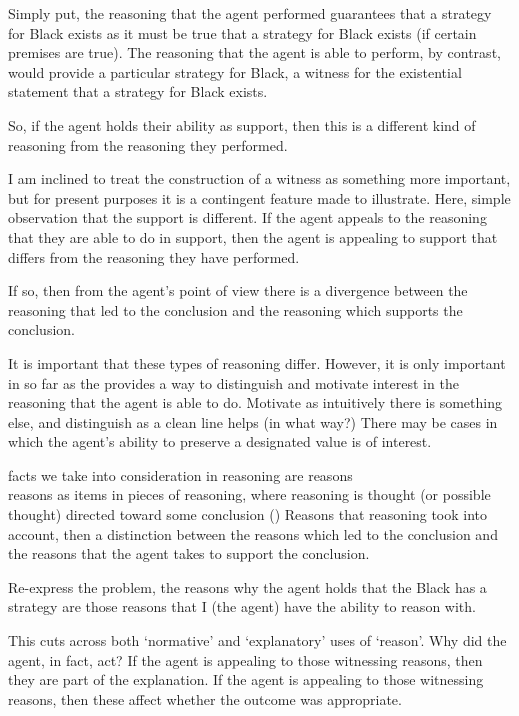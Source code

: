 \documentclass[10pt]{article}
\begin{document}
\begin{note}
  Simply put, the reasoning that the agent performed guarantees that a strategy for Black exists as it must be true that a strategy for Black exists (if certain premises are true).
  The reasoning that the agent is able to perform, by contrast, would provide a particular strategy for Black, a witness for the existential statement that a strategy for Black exists.

  So, if the agent holds their ability as support, then this is a different kind of reasoning from the reasoning they performed.

  I am inclined to treat the construction of a witness as something more important, but for present purposes it is a contingent feature made to illustrate.
  Here, simple observation that the support is different.
  If the agent appeals to the reasoning that they are able to do in support, then the agent is appealing to support that differs from the reasoning they have performed.

  If so, then from the agent's point of view there is a divergence between the reasoning that led to the conclusion and the reasoning which supports the conclusion.

  {
    \color{red}
    It is important that these types of reasoning differ.
    However, it is only important in so far as the provides a way to distinguish and motivate interest in the reasoning that the agent is able to do.
    Motivate as intuitively there is something else, and distinguish as a clean line helps (in what way?)
    There may be cases in which the agent's ability to preserve a designated value is of interest.
  }

  {
    \color{red}
    facts we take into consideration in reasoning are reasons \\
    reasons as items in pieces of reasoning, where reasoning is thought (or possible thought) directed toward some conclusion (\citeyear[421]{Hieronymi:2011aa})
  }
  Reasons that reasoning took into account, then a distinction between the reasons which led to the conclusion and the reasons that the agent takes to support the conclusion.


  Re-express the problem, the reasons why the agent holds that the Black has a strategy are those reasons that I (the agent) have the ability to reason with.

  This cuts across both `normative' and `explanatory' uses of `reason'.
  Why did the agent, in fact, act?
  If the agent is appealing to those witnessing reasons, then they are part of the explanation.
  If the agent is appealing to those witnessing reasons, then these affect whether the outcome was appropriate.
\end{note}
\end{document}
